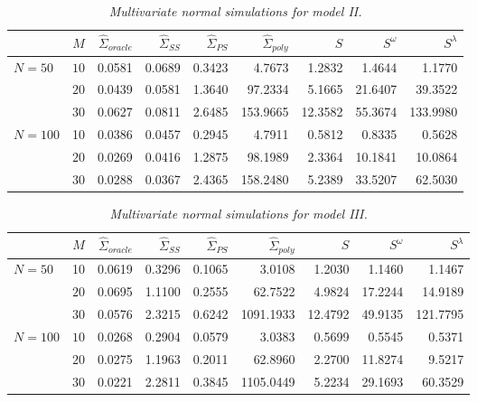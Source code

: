 \begin{table}[H]
\centering
\caption{\textit{Multivariate normal simulations for model II.}}
\begin{tabular}{lrrrrrrrr}
 & $M$ &$\hat{\Sigma}_{oracle}$& $\hat{\Sigma}_{SS}$& $\hat{\Sigma}_{PS}$ & $\hat{\Sigma}_{poly}$ & $S$ &$S^\omega$& $S^\lambda$ \\ 
  \hline
   $N = 50$ & $10$ & 0.0581 &  0.0689 & 0.3423 &4.7673 & 1.2832 & 1.4644 & 1.1770 \\ 
   & $20$ &0.0439 & 0.0581 & 1.3640 &  97.2334 & 5.1665 & 21.6407 & 39.3522 \\ 
     & $30$ & 0.0627 & 0.0811 & 2.6485 &  153.9665 & 12.3582 & 55.3674 & 133.9980 \\ 
  $N = 100$ & 10 &  0.0386 & 0.0457 & 0.2945 & 4.7911 & 0.5812 & 0.8335 & 0.5628 \\ 
    & $20$ & 0.0269 & 0.0416 & 1.2875 &  98.1989 & 2.3364 & 10.1841 & 10.0864 \\ 
    & $30$ &  0.0288 & 0.0367 & 2.4365 & 158.2480 & 5.2389 & 33.5207 & 62.5030 \\ 
   \hline
\end{tabular}
\label{table:simulation-1-entropy-loss-sigma-2}
\end{table}


%
%


\begin{table}[H]
\centering
\caption{\textit{Multivariate normal simulations for model III.} }
\begin{tabular}{lrrrrrrrr}
 & $M$ &$\hat{\Sigma}_{oracle}$&  $\hat{\Sigma}_{SS}$& $\hat{\Sigma}_{PS}$ &$\hat{\Sigma}_{poly}$ & $S$ &$S^\omega$& $S^\lambda$ \\ 
   \hline
 $N = 50$ & 10 & 0.0619 & 0.3296 & 0.1065 & 3.0108 & 1.2030 & 1.1460 & 1.1467 \\ 
      & $20$ &0.0695 & 1.1100 & 0.2555 &  62.7522 & 4.9824 & 17.2244 & 14.9189 \\ 
    & $30$ &0.0576 & 2.3215 & 0.6242 &  1091.1933 & 12.4792 & 49.9135 & 121.7795 \\ 
     $N = 100$ & $10$ & 0.0268 &  0.2904 & 0.0579 &3.0383 & 0.5699 & 0.5545 & 0.5371 \\ 
     & $20$ & 0.0275 & 1.1963 & 0.2011 & 62.8960 & 2.2700 & 11.8274 & 9.5217 \\ 
    & $30$ &  0.0221 & 2.2811 & 0.3845 &1105.0449 & 5.2234 & 29.1693 & 60.3529 \\ 
   \hline
\end{tabular}
\label{table:simulation-1-entropy-loss-sigma-3}
\end{table}

